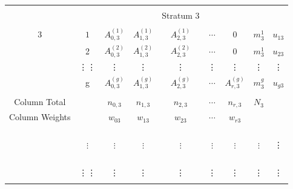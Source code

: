 \documentclass[12pt,oneside]{report}
\theoremstyle{definition}
\theoremstyle{mystyle}
\begin{document}
\begin{table}[h!]
\begin{center}
\begin{tabular}{c c|c c c c c c c}
			&&&&&&&&\\
			&&&&Stratum 3&&&&\\
			&&&&&&&&\\
			3&$ 1$ & $ A_{0,3}^{(1)}$ & $ A_{1,3}^{(1)}$ & $ A_{2,3}^{(1)}$  & $\cdots$  &$0$&$m_{3}^{1}$&$u_{13}$ \\
			&2 &$ A_{0,3}^{(2)}$ & $ A_{1,3}^{(2)}$ & $ A_{2,3}^{(2)}$  & $\cdots$  &$0$&$m_{3}^{1}$& $u_{23}$\\
			&\vdots\vdots&\vdots&\vdots&\vdots&\vdots&\vdots&\vdots&\vdots\\
			& g &$ A_{0,3}^{(g)}$ & $ A_{1,3}^{(g)}$ & $ A_{2,3}^{(g)}$  & $\cdots$  &$ A_{r,3}^{(g)}$ &$m_{3}^{g}$&$u_{g3}$ \\
			&&&&&&&&\\
			Column Total	& & $n_{0,3}$ & $n_{1,3}$ &$n_{2,3}$& $\cdots$  & $n_{r,3}$&$N_{3}$& \\ [1ex]
			Column Weights	& & $w_{03}$ & $w_{13}$ &$w_{23}$& $\cdots$  & $w_{r3}$&& \\ [1ex]
			
			&&&&&&&&\\
			&&&&&&&&\\
			&&&&&&&&\\
			&&&&&&&&\\
			&$\vdots$ & $\vdots$ & $\vdots$  & $\vdots$  & $\vdots$  & $\vdots$&$\vdots$&\vdots   \\
			
			&&&&&&&&\\
			&&&&&&&&\\
			&&&&&&&&\\
			&&&&&&&&\\
			&\vdots\vdots&\vdots&\vdots&\vdots&\vdots&\vdots&\vdots&\vdots\\
			&&&&&&&&\\
			

\end{tabular}
\end{center}
\end{table}
\end{document}
